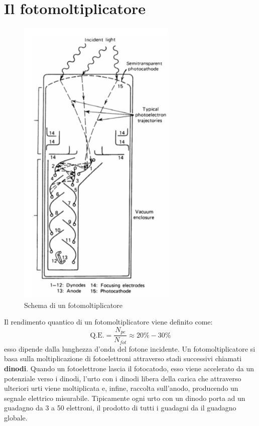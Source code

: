 \section{Il fotomoltiplicatore}
\begin{figure}[htbp]
\begin{center}
\includegraphics[scale=0.8]{./Immagini/Fotomoltiplicatore.png}
\caption{Schema di un fotomoltiplicatore}
\label{fig:fotomolt}
\end{center}
\end{figure}
Il rendimento quantico di un fotomoltiplicatore viene definito come:
\begin{equation*}
\text{Q.E.} = \frac{N_{pe}}{N_{fot}} \approx 20\% - 30\%
\end{equation*}
esso dipende dalla lunghezza d'onda del fotone incidente.
Un fotomoltiplicatore si basa sulla moltiplicazione di fotoelettroni attraverso stadi successivi chiamati \textbf{dinodi}.
Quando un fotoelettrone lascia il fotocatodo, esso viene accelerato da un potenziale verso i dinodi, l'urto con i dinodi libera della carica che
attraverso ulteriori urti viene moltiplicata e, infine, raccolta sull'anodo, producendo un segnale elettrico misurabile.
Tipicamente ogni urto con un dinodo porta ad un guadagno da 3 a 50 elettroni, il prodotto di tutti i guadagni da il guadagno globale.
